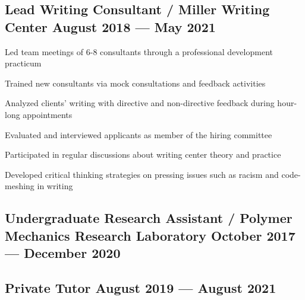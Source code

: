 \documentclass{article}
\begin{document}
\subsection{{Lead Writing Consultant / Miller Writing Center \hfill August 2018 --- May 2021}}
\begin{zitemize}
    \item Led team meetings of 6-8 consultants through a professional development practicum
    \item Trained new consultants via mock consultations and feedback activities
    \item Analyzed clients' writing with directive and non-directive feedback during hour-long appointments
    \item Evaluated and interviewed applicants as member of the hiring committee
    \item Participated in regular discussions about writing center theory and practice
    \item Developed critical thinking strategies on pressing issues such as racism and code-meshing in writing
\end{zitemize}

\subsection{{Undergraduate Research Assistant / Polymer Mechanics Research Laboratory \hfill October 2017 --- December 2020}}

\subsection{{Private Tutor \hfill August 2019 --- August 2021}}
\end{document}
